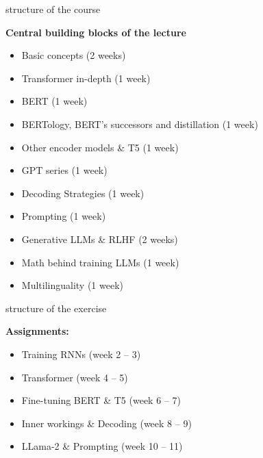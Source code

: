 \begin{vbframe}{structure of the course}

\vfill

\textbf{Central building blocks of the lecture}

	\begin{itemize}
		\item Basic concepts (2 weeks)
		\item Transformer in-depth (1 week)
		\item BERT (1 week)
		\item BERTology, BERT's successors and distillation (1 week)
		\item Other encoder models \& T5 (1 week)
		\item GPT series (1 week)
		\item Decoding Strategies (1 week)
		\item Prompting (1 week)
		\item Generative LLMs \& RLHF (2 weeks)
		\item Math behind training LLMs (1 week)
		\item Multilinguality (1 week)
	\end{itemize}

\vfill

\end{vbframe}


\begin{vbframe}{structure of the exercise}

\vfill

\textbf{Assignments:}

	\begin{itemize}
		\item Training RNNs (week 2 -- 3)
		\item Transformer (week 4 -- 5)
		\item Fine-tuning BERT \& T5 (week 6 -- 7)
		\item Inner workings \& Decoding (week 8 -- 9)
		\item LLama-2 \& Prompting (week 10 -- 11)
	\end{itemize}

\vfill

\end{vbframe}


